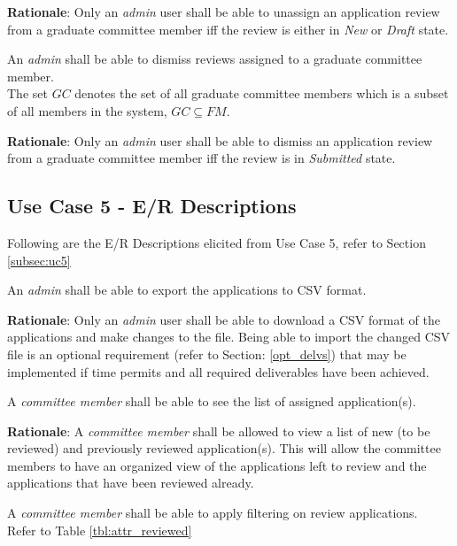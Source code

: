 \documentclass[fontsize=12pt,paper=letter,twoside]{scrartcl}
\begin{document}
\smallskip
\noindent \textbf{Rationale}: Only an \emph{admin} user shall be able to unassign an application review from a graduate committee member iff the review is either in \emph{New} or \emph{Draft} state.

\rdescription
{An \emph{admin} shall be able to dismiss reviews assigned to a graduate committee member.\\}
{The set $GC$ denotes the set of all graduate committee members which is a subset of all members in the system, $GC \subseteq FM$.}

\smallskip
\noindent \textbf{Rationale}: Only an \emph{admin} user shall be able to dismiss an application review from a graduate committee member iff the review is in \emph{Submitted} state.


\subsection{Use Case 5 - E/R Descriptions}

Following are the E/R Descriptions elicited from Use Case 5, refer to Section \ref{subsec:uc5}

\genreq
{An \emph{admin} shall be able to export the applications to CSV format.\\}
{}
\label{R14}

\smallskip
\noindent \textbf{Rationale}: Only an \emph{admin} user shall be able to download a CSV format of the applications and make changes to the file. Being able to import the changed CSV file is an optional requirement (refer to Section: \ref{opt_delvs}) that may be implemented if time permits and all required deliverables have been achieved.

\genreq
{A \emph{committee member} shall be able to see the list of assigned application(s).\\}
{}
\label{R15}

\smallskip
\noindent \textbf{Rationale}: A \emph{committee member} shall be allowed to view a list of new (to be reviewed) and previously reviewed application(s). This will allow the committee members to have an organized view of the applications left to review and the applications that have been reviewed already.

\rdescription
{A \emph{committee member} shall be able to apply filtering on review applications.\\}
{Refer to Table \ref{tbl:attr_reviewed}}
\label{R16}
\end{document}
